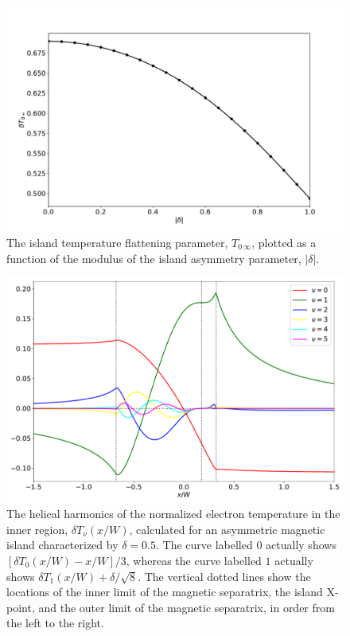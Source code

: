 \documentclass[12pt,prb,aps]{revtex4-1}
\begin{document}
\begin{figure}
\centerline{\includegraphics[width=\textwidth]{Fig5.pdf}}
\caption{The island temperature flattening parameter, $T_{0\,\infty}$, plotted as a function of the modulus of the island asymmetry parameter, $|\delta|$.  \label{fig3}}
\end{figure}

\begin{figure}
\centerline{\includegraphics[width=\textwidth]{Fig6.pdf}}
\caption{The helical harmonics of the normalized electron temperature  in the inner region, $\delta T_\nu(x/W)$, calculated for an asymmetric
magnetic island characterized by $\delta=0.5$.  The curve labelled $0$ actually shows $[\delta T_0(x/W)-x/W]/3$, whereas the
curve labelled  $1$ actually
shows $\delta T_1(x/W) +  \delta/\sqrt{8}$. The vertical dotted lines show the locations of the inner limit of the magnetic separatrix,
the island X-point, and the outer limit of the magnetic separatrix, in order from the left to the right.\label{fig4}}
\end{figure}
\end{document}
